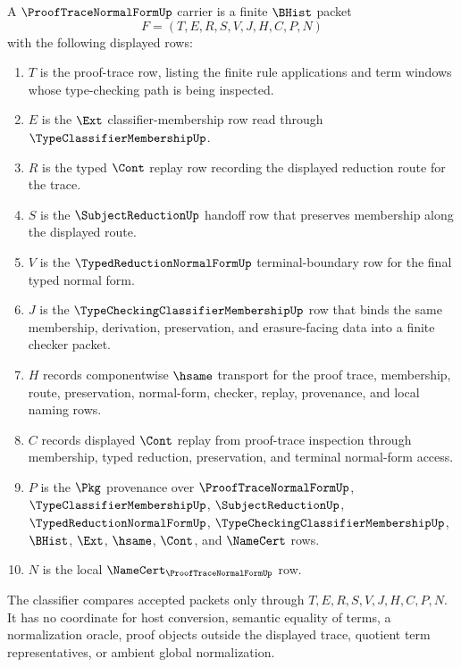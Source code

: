 \begin{definition}
\label{def:proof-trace-normal-form-carrier}
A $\ProofTraceNormalFormUp$ carrier is a finite $\BHist$ packet
$$
F=(T,E,R,S,V,J,H,C,P,N)
$$
with the following displayed rows:
\begin{enumerate}
\item $T$ is the proof-trace row, listing the finite rule applications and term windows whose type-checking path is being inspected.
\item $E$ is the $\Ext$ classifier-membership row read through $\TypeClassifierMembershipUp$.
\item $R$ is the typed $\Cont$ replay row recording the displayed reduction route for the trace.
\item $S$ is the $\SubjectReductionUp$ handoff row that preserves membership along the displayed route.
\item $V$ is the $\TypedReductionNormalFormUp$ terminal-boundary row for the final typed normal form.
\item $J$ is the $\TypeCheckingClassifierMembershipUp$ row that binds the same membership, derivation, preservation, and erasure-facing data into a finite checker packet.
\item $H$ records componentwise $\hsame$ transport for the proof trace, membership, route, preservation, normal-form, checker, replay, provenance, and local naming rows.
\item $C$ records displayed $\Cont$ replay from proof-trace inspection through membership, typed reduction, preservation, and terminal normal-form access.
\item $P$ is the $\Pkg$ provenance over $\ProofTraceNormalFormUp$, $\TypeClassifierMembershipUp$, $\SubjectReductionUp$, $\TypedReductionNormalFormUp$, $\TypeCheckingClassifierMembershipUp$, $\BHist$, $\Ext$, $\hsame$, $\Cont$, and $\NameCert$ rows.
\item $N$ is the local $\NameCert_{\ProofTraceNormalFormUp}$ row.
\end{enumerate}
The classifier compares accepted packets only through $T,E,R,S,V,J,H,C,P,N$. It has no coordinate for host conversion, semantic equality of terms, a normalization oracle, proof objects outside the displayed trace, quotient term representatives, or ambient global normalization.
\end{definition}

